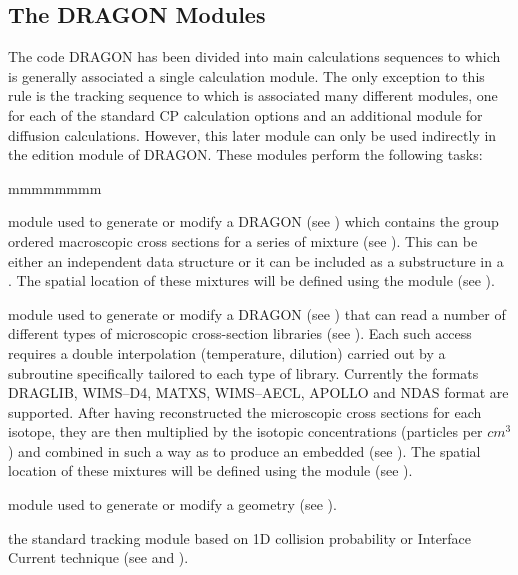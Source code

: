 \subsection{The DRAGON Modules}\label{sect:DragonModules}

The code DRAGON has been divided into main calculations sequences to
which is generally associated a single calculation module. The only exception
to this rule is the tracking sequence to which is associated many different
modules, one for each of the standard CP calculation options and an additional
module for diffusion calculations. However, this later module can only be used
indirectly in the edition module of DRAGON. These modules perform the
following tasks:
  
\begin{ListeDeDescription}{mmmmmmmm}

\item[\moc{MAC:}]  module used to generate or modify a DRAGON
 (see ) which contains the group ordered
macroscopic cross sections for a series of mixture (see ). This
 can be either an independent data structure or it can be included
as a substructure in a . The spatial location of these mixtures
will be defined using the  module (see ).

\item[\moc{LIB:}]  module used to generate or modify a DRAGON
 (see ) that can read a number of
different types of microscopic cross-section libraries (see ). Each
such access requires a double interpolation (temperature, dilution) carried out
by a subroutine specifically tailored to each type of library. Currently the
formats DRAGLIB\cite{DragonDataStructures}, WIMS--D4\cite{WIMS-D}, MATXS\cite{MATXS}, WIMS--AECL\cite{WIMS}, 
APOLLO\cite{Apollo,Apollo2} and NDAS format\cite{ndas} are supported. After having reconstructed the  microscopic
cross sections for each isotope, they are then  multiplied  by the isotopic
concentrations (particles per $cm^{3}$) and combined in such a way as to produce
an embedded  (see ). The spatial location
of these mixtures will be defined using the  module (see
).

\item[\moc{GEO:}] module used to generate or modify a
geometry (see ).

\item[\moc{SYBILT:}] the standard tracking module based on 1D collision
probability or Interface Current technique (see  and ).


\end{ListeDeDescription}
